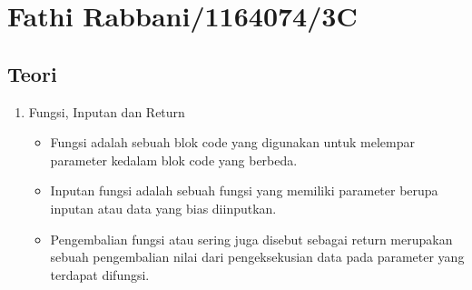 \section{Fathi Rabbani/1164074/3C}
\subsection{Teori}
\begin{enumerate}
\item Fungsi, Inputan dan Return
	\begin{itemize}
	\item Fungsi adalah sebuah blok code yang digunakan untuk melempar parameter kedalam blok code yang berbeda.
		
	\item Inputan fungsi adalah sebuah fungsi yang memiliki parameter berupa inputan atau data yang bias diinputkan.
		
	\item Pengembalian fungsi atau sering juga disebut sebagai return merupakan sebuah pengembalian nilai dari pengeksekusian data pada parameter yang terdapat difungsi.
		
	\end{itemize}


\end{enumerate}

